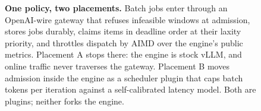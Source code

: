 \begin{figure}[t]
{}
\caption[System overview: one policy, two placements]{%
  \textbf{One policy, two placements.} Batch jobs enter through an OpenAI-wire gateway
  that  refuses infeasible windows at admission,  stores jobs
  durably,  claims items in deadline order at their laxity priority, and
   throttles dispatch by AIMD over the engine's public metrics. Placement A
  stops there: the engine is stock vLLM, and online traffic never traverses the gateway.
  Placement B moves admission inside the engine  as a scheduler plugin that
  caps batch tokens per iteration against a self-calibrated latency model. Both are
  plugins; neither forks the engine.}
\label{fig:overview}
\end{figure}
